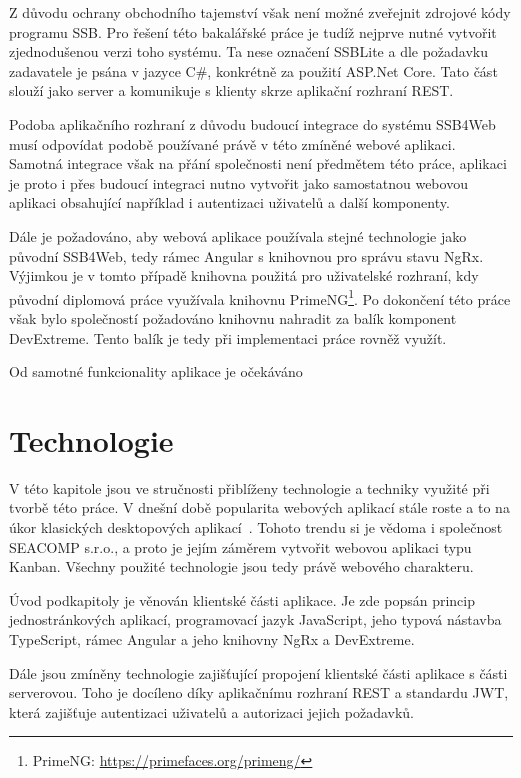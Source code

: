 Z důvodu ochrany obchodního tajemství však není možné zveřejnit zdrojové kódy programu SSB. Pro řešení této bakalářské práce je tudíž nejprve nutné vytvořit zjednodušenou verzi toho systému. Ta nese označení SSBLite a dle požadavku zadavatele je psána v jazyce C\#, konkrétně za použití ASP.Net Core. Tato část slouží jako server a komunikuje s klienty skrze aplikační rozhraní REST.

Podoba aplikačního rozhraní z důvodu budoucí integrace do systému SSB4Web musí odpovídat podobě používané právě v této zmíněné webové aplikaci. Samotná integrace však na přání společnosti není předmětem této práce, aplikaci je proto i přes budoucí integraci nutno vytvořit jako samostatnou webovou aplikaci obsahující například i autentizaci uživatelů a další komponenty.

Dále je požadováno, aby webová aplikace používala stejné technologie jako původní SSB4Web, tedy rámec Angular s knihovnou pro správu stavu NgRx. Výjimkou je v tomto případě knihovna použitá pro uživatelské rozhraní, kdy původní diplomová práce využívala knihovnu PrimeNG\footnote{PrimeNG: \url{https://primefaces.org/primeng/}}. Po dokončení této práce však bylo společností požadováno knihovnu nahradit za balík komponent DevExtreme. Tento balík je tedy při implementaci práce rovněž využít.

Od samotné funkcionality aplikace je očekáváno \blindtext

\chapter{Technologie}
V této kapitole jsou ve stručnosti přiblíženy technologie a techniky využité při tvorbě této práce. 
V dnešní době popularita webových aplikací stále roste a to na úkor klasických desktopových aplikací~\cite{bib:web-apps-popular}. Tohoto trendu si je vědoma i společnost SEACOMP s.r.o., a proto je jejím záměrem vytvořit webovou aplikaci typu Kanban. Všechny použité technologie jsou tedy právě webového charakteru.

Úvod podkapitoly je věnován klientské části aplikace. Je zde popsán princip jednostránkových aplikací, programovací jazyk JavaScript, jeho typová nástavba TypeScript, rámec Angular a jeho knihovny NgRx a DevExtreme.

Dále jsou zmíněny technologie zajišťující propojení klientské části aplikace s části serverovou. Toho je docíleno díky aplikačnímu rozhraní REST a standardu JWT, která zajišťuje autentizaci uživatelů a autorizaci jejich požadavků.

